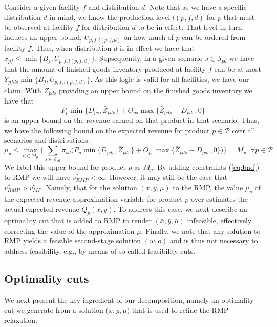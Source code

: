 \documentclass[12pt]{article}
\theoremstyle{thmstylethree}%
\begin{document}
Consider a given facility $f$ and distribution $d$. Note that as we have a specific distribution $d$ in mind, we know the production level $l(p,f,d)$ for $p$ that must be observed at facility $f$ for distribution $d$ to be in effect. That level in turn induces an upper bound, $U_{p,f,l(p,f,d)}$ on how much of $p$ can be ordered from facility $f.$ Thus, when distribution $d$ is in effect we have that $x_{pf} \leq \min\bigg\{B_f,U_{p,f,l(p,f,d)}\bigg\}$. Supsequently, in a given scenario $s \in \mathcal{S}_{pd}$ we have that the amount of finished goods inventory produced at facility $f$ can be at most $Y_{pfds}\min\bigg\{B_f,U_{p,f,l(p,f,d)}\bigg\}$. As this logic is valid for all facilities, we have our claim.  With $\bar{Z}_{pds}$ providing an upper bound on the finished goods inventory we have that 
$$P_{p}\min\bigg\{D_{ps},\bar{Z}_{pds}\bigg\}+O_{ps}\max\bigg\{\bar{Z}_{pds}-D_{pds},0\bigg\}$$
is an upper bound on the revenue earned on that product in that scenario. Thus, we have the following bound on the expected revenue for product $p \in \mathcal{P}$ over all scenarios and distributions.  
\begin{equation}\label{eq:bnd}
\mu_{p} \leq  \max_{d \in \mathcal{D}_{p}} \bigg\{\sum_{s \in \mathcal{S}_{sd}} \pi_{sd} \bigg(P_{p}\min\big\{D_{pds},\bar{Z}_{pds}\big\}+O_{ps}\max\big\{\bar{Z}_{pds}-D_{pds},0\big\}\bigg)\bigg\}  = M_{p} \;\; \forall p \in \mathcal{P} \tag{Bnd-p}
\end{equation}
We label this upper bound for product $p$ as $M_{p}$. By adding constraints (\ref{eq:bnd}) to RMP we will have $v^{*}_{RMP} < \infty.$ However, it may still be the case that $v^{*}_{RMP} > v^{*}_{MP}.$ Namely, that for the solution $(\bar{x},\bar{y},\bar{\mu})$ to the RMP, the value $\bar{\mu_{p}}$ of the expected revenue approximation variable for product $p$ over-estimates the actual expected revenue $Q_{p}(\bar{x},\bar{y})$. To address this case, we next describe an optimality cut that is added to RMP to render $(\bar{x},\bar{y},\bar{\mu})$ infeasible, effectively correcting the value of the approximation $\mu$. Finally, we note that any solution to RMP yields a feasible second-stage solution $(w,o)$ and is thus not necessary to address feasibility, e.g., by means of so called feasibility cuts.

\subsection{Optimality cuts}
\label{subsec:opt_cut}
We next present the key ingredient of our decomposition, namely an optimality cut we generate from a solution $\big(\bar{x},\bar{y},\bar{\mu}\big)$ that is used to refine the RMP relaxation. 
\end{document}
